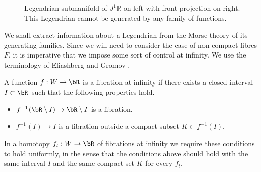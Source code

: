 \begin{figure}[htbp]
\begin{center}
\caption{\smaller Legendrian submanifold of $J^1\mathbb R$ on left with front projection on right. This Legendrian cannot be generated by any family of functions.}
\label{FigLegendrian}
\end{center}
\end{figure}

We shall extract information about a Legendrian from the Morse theory of its generating families. Since we will need to consider the case of non-compact fibres $F$, it is imperative that we impose some sort of control at infinity. We use the terminology of Eliashberg and Gromov \cite{EG98}.

\begin{definition}\label{Definition: fibration at infinity}
A function $f:W \to \bR$ is a fibration at infinity if there exists a closed interval $I \subset \bR$ such that the following properties hold.
\begin{itemize}
\item $f^{-1}(\bR \setminus I) \to \bR \setminus I$ is a fibration.
\item $f^{-1}(I)\to I$ is a fibration outside a compact subset $K \subset f^{-1}(I)$.
\end{itemize}
\end{definition}

\begin{remark}\label{Remark: infinity family}
In a homotopy $f_t: W \to \bR$ of fibrations at infinity we require these conditions to hold uniformly, in the sense that the conditions above should hold with the same interval $I$ and the same compact set $K$ for every $f_t$.
\end{remark}


